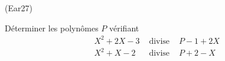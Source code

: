 \begin{tiny}(Ear27)\end{tiny} Déterminer les polynômes $P$ vérifiant
\[
  \begin{aligned}
    &X^2 + 2X - 3 &\text{ divise }& P -1 +2X \\
    &X^2 + X - 2 &\text{ divise }& P + 2 - X
  \end{aligned}
\]
